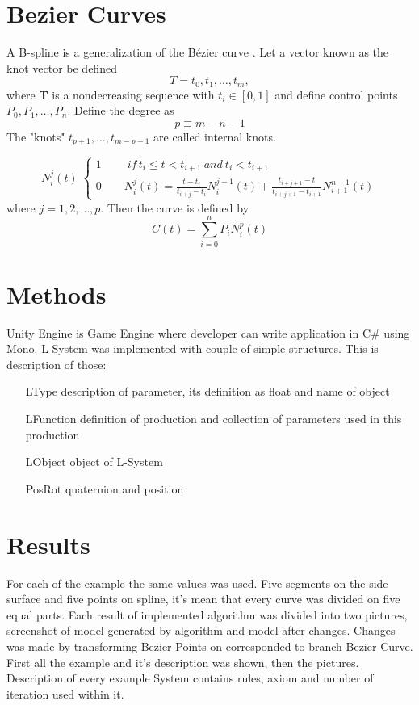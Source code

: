 \documentclass[b5paper,twoside,11pt]{article}
\begin{document}
\section{Bezier Curves}
A B-spline is a generalization of the Bézier curve \cite{BSpline}. Let a vector known as the knot vector be defined 
\begin{equation*}
T={t_0,t_1,\ldots,t_m},
\end{equation*}
where \textbf{T} is a nondecreasing sequence with $t_i\in[0,1]$ and define control points \textbf{$P_0,P_1,\ldots,P_n$}. Define the degree as
\begin{equation*}
p\equiv m-n-1
\end{equation*}
The "knots" $t_{p+1},\ldots,t_{m-p-1}$ are called internal knots.


\begin{equation*} N_{i}^{j}(t)\;
\begin{cases} 1\qquad \;if \, t_i\leq t< t_{i+1}\:and\: t_i<t_{i+1} \\ 
0 \qquad   N_{i}^{j}(t)=\frac{t-t_i}{t_{i+j}-t_i} N_{i}^{j-1}(t) + \frac{t_{i+j+1} - t}{t_{i+j+1} - t_{i+1}} N_{i+1}^{n-1}(t)
 \end{cases}
  \end{equation*}
  where $j=1,2,\ldots,p$. Then the curve is defined by
  \begin{equation*}
  C(t)=\sum\limits_{i=0}^n P_i N_{i}^{p}(t)
  \end{equation*}

\section{Methods}
Unity Engine is Game Engine where developer can write application in C\# using Mono. L-System was implemented with couple of simple structures. This is description of those:
\begin{itemize}[labelindent=5.5em,labelsep=1cm,leftmargin=*]
\item [LType] description of parameter, its definition as float and name of object
\item [LFunction] definition of production and collection of parameters used in this production
\item [LObject] object of L-System
\item [PosRot] quaternion and position
\end{itemize}

\section{Results}
For each of the example the same values was used. Five segments on the side surface and five points on spline, it's mean that every curve was divided on five equal parts. Each result of implemented algorithm was divided into two pictures, screenshot of model generated by algorithm and model after changes. Changes was made by transforming Bezier Points on corresponded to branch Bezier Curve. First all the example and it's description was shown, then the pictures. Description of every example System contains rules, axiom and number of iteration used within it.
\end{document}
